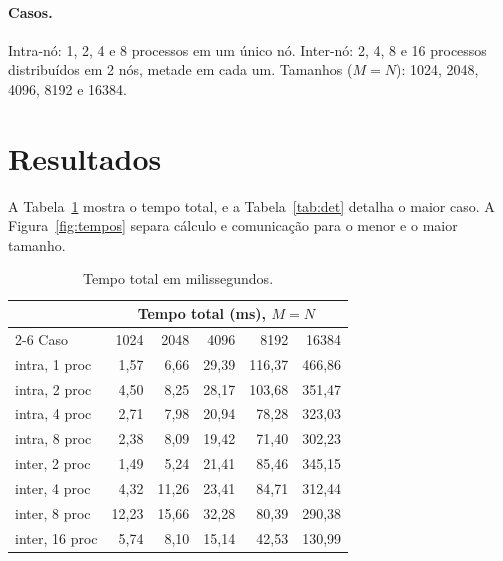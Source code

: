 \documentclass[a4paper,12pt]{article}
\begin{document}
\paragraph{Casos.} Intra-nó: 1, 2, 4 e 8 processos em um único nó. Inter-nó: 2, 4, 8 e 16 processos distribuídos em 2 nós, metade em cada um. Tamanhos ($M=N$): 1024, 2048, 4096, 8192 e 16384.

\section{Resultados}

A Tabela~\ref{tab:total} mostra o tempo total, e a Tabela~\ref{tab:det} detalha o maior caso. A Figura~\ref{fig:tempos} separa cálculo e comunicação para o menor e o maior tamanho.

\begin{table}[h!]
\centering
\begin{tabular}{lrrrrr}
\toprule
 & \multicolumn{5}{c}{Tempo total (ms), $M=N$} \\
\cmidrule(l){2-6}
Caso & 1024 & 2048 & 4096 & 8192 & 16384 \\
\midrule
intra, 1 proc  & 1,57 & 6,66 & 29,39 & 116,37 & 466,86 \\
intra, 2 proc  & 4,50 & 8,25 & 28,17 & 103,68 & 351,47 \\
intra, 4 proc  & 2,71 & 7,98 & 20,94 & 78,28 & 323,03 \\
intra, 8 proc  & 2,38 & 8,09 & 19,42 & 71,40 & 302,23 \\
inter, 2 proc  & 1,49 & 5,24 & 21,41 & 85,46 & 345,15 \\
inter, 4 proc  & 4,32 & 11,26 & 23,41 & 84,71 & 312,44 \\
inter, 8 proc  & 12,23 & 15,66 & 32,28 & 80,39 & 290,38 \\
inter, 16 proc & 5,74 & 8,10 & 15,14 & 42,53 & 130,99 \\
\bottomrule
\end{tabular}
\caption{Tempo total em milissegundos.}
\label{tab:total}
\end{table}
\end{document}
